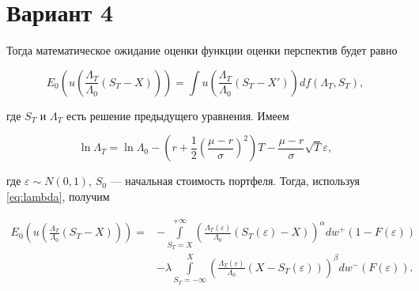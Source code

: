 \documentclass{article}
\begin{document}
\section*{Вариант 4}

Тогда математическое ожидание оценки функции оценки перспектив будет равно

\[
E_0 \left( u \left( \frac{\Lambda_T}{\Lambda_0} (S_T - X) \right) \right) = \int u \left( \frac{\Lambda_T}{\Lambda_0} (S_T - X') \right) df(\Lambda_T, S_T),
\]

где $S_T$ и $\Lambda_T$ есть решение предыдущего уравнения. Имеем

\begin{equation}
\ln \Lambda_T = \ln \Lambda_0 - \left( r + \frac{1}{2} \left( \frac{\mu - r}{\sigma} \right)^2 \right) T - \frac{\mu - r}{\sigma} \sqrt{T} \varepsilon,
\label{eq:lambda}
\end{equation}

где $\varepsilon \sim N(0,1)$, $S_0$ — начальная стоимость портфеля. Тогда, используя \eqref{eq:lambda}, получим

\begin{equation}
\begin{aligned}
E_0 \left( u \left( \frac{\Lambda_T}{\Lambda_0} (S_T - X) \right) \right) = 
& -\int\limits_{S_T = X}^{+\infty} \left( \frac{\Lambda_T(\varepsilon)}{\Lambda_0} (S_T(\varepsilon) - X) \right)^\alpha dw^+(1 - F(\varepsilon)) \\
& - \lambda \int\limits_{S_T = -\infty}^{X} \left( \frac{\Lambda_T(\varepsilon)}{\Lambda_0} (X - S_T(\varepsilon)) \right)^\beta dw^- (F(\varepsilon)).
\end{aligned}
\end{equation}
\end{document}
